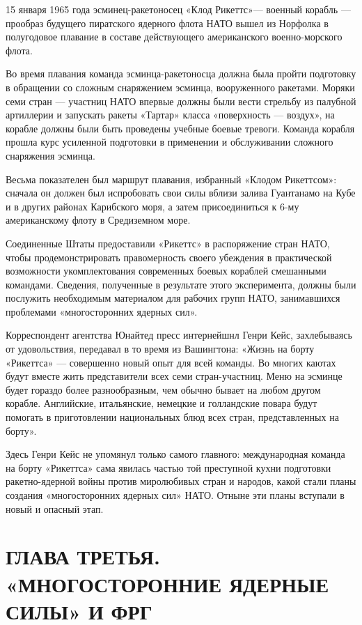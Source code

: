\documentclass[12pt, a4paper, openany]{book}
\begin{document}
	15 января 1965 года эсминец-ракетоносец «Клод Рикеттс»— военный корабль — прообраз будущего пиратского ядерного флота НАТО вышел из Норфолка в полугодовое плавание в составе действующего американского военно-морского флота.
	
	Во время плавания команда эсминца-ракетоносца должна была пройти подготовку в обращении со сложным снаряжением эсминца, вооруженного ракетами. Моряки семи стран — участниц НАТО впервые должны были вести стрельбу из палубной артиллерии и запускать ракеты «Тартар» класса «поверхность — воздух», на корабле должны были быть проведены учебные боевые тревоги. Команда корабля прошла курс усиленной подготовки в применении и обслуживании сложного снаряжения эсминца.
	
	Весьма показателен был маршрут плавания, избранный «Клодом Рикеттсом»: сначала он должен был испробовать свои силы вблизи залива Гуантанамо на Кубе и в других районах Карибского моря, а затем присоединиться к 6-му американскому флоту в Средиземном море.
	
	Соединенные Штаты предоставили «Рикеттс» в распоряжение стран НАТО, чтобы продемонстрировать правомерность своего убеждения в практической возможности укомплектования современных боевых кораблей смешанными командами. Сведения, полученные в результате этого эксперимента, должны были послужить необходимым материалом для рабочих групп НАТО, занимавшихся проблемами «многосторонних ядерных сил».
	
	Корреспондент агентства Юнайтед пресс интернейшнл Генри Кейс, захлебываясь от удовольствия, передавал в то время из Вашингтона: «Жизнь на борту «Рикеттса» — совершенно новый опыт для всей команды. Во многих каютах будут вместе жить представители всех семи стран-участниц. Меню на эсминце будет гораздо более разнообразным, чем обычно бывает на любом другом корабле. Английские, итальянские, немецкие и голландские повара будут помогать в приготовлении национальных блюд всех стран, представленных на борту».
	
	Здесь Генри Кейс не упомянул только самого главного: международная команда на борту «Рикеттса» сама явилась частью той преступной кухни подготовки ракетно-ядерной войны против миролюбивых стран и народов, какой стали планы создания «многосторонних ядерных сил» НАТО. Отныне эти планы вступали в новый и опасный этап.
	
			\newpage
	\section[Глава третья. «МНОГОСТОРОННИЕ ЯДЕРНЫЕ СИЛЫ» И ФРГ]{\center ГЛАВА ТРЕТЬЯ.\\ \textbf{«МНОГОСТОРОННИЕ ЯДЕРНЫЕ СИЛЫ» И ФРГ}}	
\end{document}
